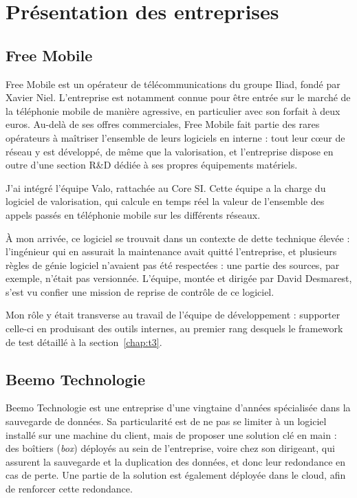 \chapter{Présentation des entreprises}
\label{chap:entreprises}


\section{Free Mobile}
Free Mobile est un opérateur de télécommunications du groupe Iliad, fondé
par Xavier Niel. L'entreprise est notamment connue pour être entrée sur le
marché de la téléphonie mobile de manière agressive, en particulier avec son
forfait à deux euros. Au-delà de ses offres commerciales, Free Mobile fait
partie des rares opérateurs à maîtriser l'ensemble de leurs logiciels en
interne : tout leur cœur de réseau y est développé, de même que la
valorisation, et l'entreprise dispose en outre d'une section R\&D dédiée à
ses propres équipements matériels.

J'ai intégré l'équipe Valo, rattachée au Core SI. Cette équipe a la charge
du logiciel de valorisation, qui calcule en temps réel la valeur de l'ensemble des appels
passés en téléphonie mobile sur les différents réseaux.

À mon arrivée, ce logiciel se trouvait dans un contexte de dette technique
élevée : l'ingénieur qui en assurait la maintenance avait quitté
l'entreprise, et plusieurs règles de génie logiciel n'avaient pas été
respectées : une partie des sources, par exemple, n'était pas versionnée. L'équipe, montée et dirigée par David Desmarest, s'est vu confier une
mission de reprise de contrôle de ce logiciel.

Mon rôle y était transverse au travail de l'équipe de développement :
supporter celle-ci en produisant des outils internes, au premier rang
desquels le framework de test détaillé à la section~\ref{chap:t3}.

\section{Beemo Technologie}
Beemo Technologie est une entreprise d'une vingtaine d'années spécialisée
dans la sauvegarde de données. Sa particularité est de ne pas se limiter à
un logiciel installé sur une machine du client, mais de proposer une
solution clé en main : des boîtiers (\emph{box}) déployés au sein de
l'entreprise, voire chez son dirigeant, qui assurent la sauvegarde et la
duplication des données, et donc leur redondance en cas de perte.
Une partie de la solution est également déployée dans le cloud, afin de renforcer cette redondance.

